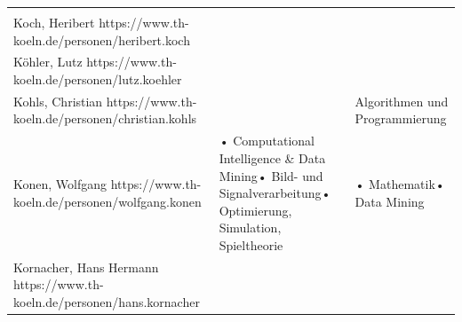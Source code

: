 \begin{longtable}[c]{@{}lll@{}}
\begin{minipage}[t]{0.52\columnwidth}
\strut\end{minipage}\tabularnewline
\begin{minipage}[t]{0.52\columnwidth}\raggedright\strut
Koch, Heribert https://www.th-koeln.de/personen/heribert.koch
\strut\end{minipage} &
\begin{minipage}[t]{0.52\columnwidth}\raggedright\strut
~
\strut\end{minipage} &
\begin{minipage}[t]{0.52\columnwidth}\raggedright\strut
\strut\end{minipage}\tabularnewline
\begin{minipage}[t]{0.52\columnwidth}\raggedright\strut
Köhler, Lutz https://www.th-koeln.de/personen/lutz.koehler
\strut\end{minipage} &
\begin{minipage}[t]{0.52\columnwidth}\raggedright\strut
~
\strut\end{minipage} &
\begin{minipage}[t]{0.52\columnwidth}\raggedright\strut
\strut\end{minipage}\tabularnewline
\begin{minipage}[t]{0.52\columnwidth}\raggedright\strut
Kohls, Christian https://www.th-koeln.de/personen/christian.kohls
\strut\end{minipage} &
\begin{minipage}[t]{0.52\columnwidth}\raggedright\strut
~
\strut\end{minipage} &
\begin{minipage}[t]{0.52\columnwidth}\raggedright\strut
Algorithmen und Programmierung
\strut\end{minipage}\tabularnewline
\begin{minipage}[t]{0.52\columnwidth}\raggedright\strut
Konen, Wolfgang https://www.th-koeln.de/personen/wolfgang.konen
\strut\end{minipage} &
\begin{minipage}[t]{0.52\columnwidth}\raggedright\strut
• Computational Intelligence \& Data Mining• Bild- und
Signalverarbeitung• Optimierung, Simulation, Spieltheorie
\strut\end{minipage} &
\begin{minipage}[t]{0.52\columnwidth}\raggedright\strut
• Mathematik• Data Mining
\strut\end{minipage}\tabularnewline
\begin{minipage}[t]{0.52\columnwidth}\raggedright\strut
Kornacher, Hans Hermann https://www.th-koeln.de/personen/hans.kornacher

\end{minipage}
\end{longtable}
